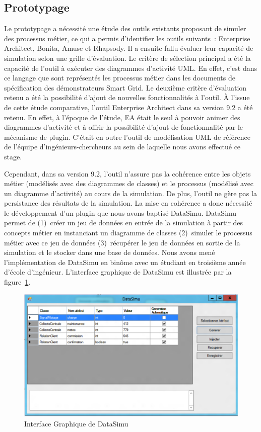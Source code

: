 \subsection{Prototypage}
Le prototypage a nécessité une étude des outils existants proposant de 
simuler des processus métier, ce qui a permis d'identifier les outils suivants~: 
Enterprise Architect, Bonita, Amuse et Rhapsody. Il a ensuite fallu évaluer leur capacité de simulation selon une grille d'évaluation. Le critère de 
sélection principal a été la capacité de l'outil à exécuter des diagrammes 
d'activité UML. En effet, c'est dans ce langage que sont représentés les 
processus métier dans les documents de spécification des démonstrateurs Smart 
Grid. Le deuxième critère d'évaluation retenu a été la possibilité d'ajout de 
nouvelles fonctionnalités à l'outil. À l'issue de cette étude comparative, 
l'outil Enterprise Architect dans sa version 9.2 a été retenu. En effet, à 
l'époque de l'étude, EA était le seul à pouvoir animer des diagrammes d'activité 
et à offrir la possibilité d'ajout de fonctionnalité par le mécanisme de plugin. 
C'était en outre l'outil de modélisation UML de référence de l'équipe 
d'ingénieurs-chercheurs au sein de laquelle nous avons effectué ce stage.
				
Cependant, dans sa version 9.2, l'outil n'assure pas la cohérence entre les 
objets métier (modélisés avec des diagrammes de classes) et le processus (modélisé 
avec un diagramme d'activité) au cours de la simulation. De plus, l'outil ne 
gère pas la persistance des résultats de la simulation. La mise en cohérence a 
donc nécessité le développement d'un plugin que nous avons baptisé DataSimu. 
DataSimu permet de (1)~créer un jeu de données en entrée de la simulation à 
partir des concepts métier en instanciant un diagramme de classes (2)~simuler le 
processus métier avec ce jeu de données (3)~récupérer le jeu de données en sortie 
de la simulation et le stocker dans une base de données. Nous avons mené 
l'implémentation de DataSimu en binôme avec un étudiant en troisième année 
d'école d'ingénieur. L'interface graphique de DataSimu est illustrée par la 
figure~\ref{fig:data_simu}.
				
\begin{figure}[!ht]
  \centering
  \includegraphics[width=1\textwidth]{figures/6_methodologie/data_simu.png}
  \caption{Interface Graphique de DataSimu}
  \label{fig:data_simu}
\end{figure}
				
